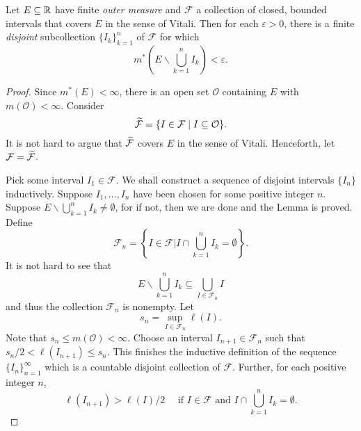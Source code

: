 \begin{lemma}
    Let $E\subseteq\mathbb{R}$ have finite \emph{outer measure} and $\mathcal F$ a collection of closed, bounded intervals that covers $E$ in the sense of Vitali. Then for each $\varepsilon > 0$, there is a finite \emph{disjoint} subcollection $\{I_k\}_{k = 1}^n$ of $\mathcal F$ for which 
    \begin{equation*}
        m^*\left(E\backslash\bigcup_{k = 1}^n I_k\right) < \varepsilon.
    \end{equation*}
\end{lemma}
\begin{proof}
    Since $m^*(E) < \infty$, there is an open set $\mathcal O$ containing $E$ with $m(\mathcal O) < \infty$. Consider 
    \begin{equation*}
        \widetilde{\mathcal F} = \{I\in\mathcal F\mid I\subseteq\mathcal O\}.
    \end{equation*}
    It is not hard to argue that $\widetilde{\mathcal F}$ covers $E$ in the sense of Vitali. Henceforth, let $\mathcal F = \widetilde{\mathcal F}$. 

    Pick some interval $I_1\in\mathcal F$. We shall construct a sequence of disjoint intervals $\{I_n\}$ inductively. Suppose $I_1,\dots,I_n$ have been chosen for some positive integer $n$. Suppose $E\backslash\bigcup_{k = 1}^n I_k\ne\emptyset$, for if not, then we are done and the Lemma is proved. Define 
    \begin{equation*}
        \mathcal F_n = \left\{I\in\mathcal F\bigg\vert I\cap\bigcup_{k = 1}^n I_k = \emptyset\right\}.
    \end{equation*}
    It is not hard to see that 
    \begin{equation*}
        E\backslash\bigcup_{k = 1}^n I_k\subseteq\bigcup_{I\in\mathcal F_n} I
    \end{equation*}
    and thus the collection $\mathcal F_n$ is nonempty. Let 
    \begin{equation*}
        s_n = \sup_{I\in\mathcal F_n}\ell(I).
    \end{equation*}
    Note that $s_n\le m(\mathcal O) < \infty$. Choose an interval $I_{n + 1}\in\mathcal F_n$ such that $s_n/2 < \ell(I_{n + 1})\le s_n$. This finishes the inductive definition of the sequence $\{I_n\}_{n = 1}^\infty$ which is a countable disjoint collection of $\mathcal F$. Further, for each positive integer $n$, 
    \begin{equation*}
        \ell(I_{n + 1}) > \ell(I)/2 \quad\text{ if $I\in\mathcal F$ and } I\cap\bigcup_{k = 1}^n I_k = \emptyset.
    \end{equation*}


\end{proof}
